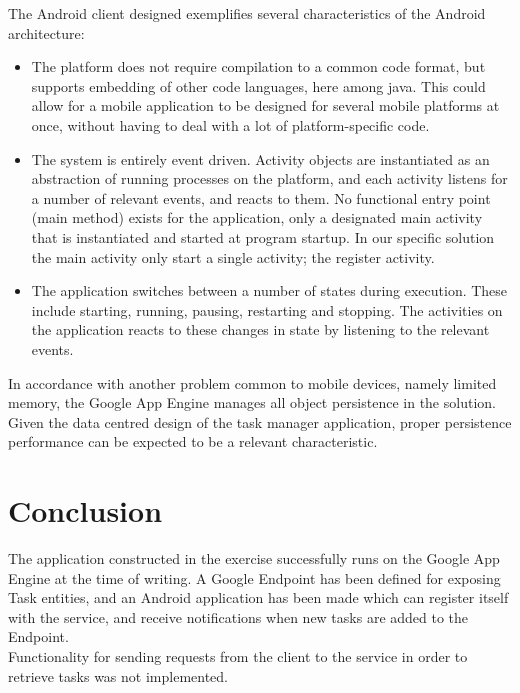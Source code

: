 The Android client designed exemplifies several characteristics of the Android architecture:
\begin{itemize}
	\item The platform does not require compilation to a common code format, but supports embedding of other code languages, here among java. This could allow for a mobile application to be designed for several mobile platforms at once, without having to deal with a lot of platform-specific code.
	\item The system is entirely event driven. Activity objects are instantiated as an abstraction of running processes on the platform, and each activity listens for a number of relevant events, and reacts to them. No functional entry point (main method) exists for the application, only a designated main activity that is instantiated and started at program startup. In our specific solution the main activity only start a single activity; the register activity.
	\item The application switches between a number of states during execution. These include starting, running, pausing, restarting and stopping. The activities on the application reacts to these changes in state by listening to the relevant events.
\end{itemize}

In accordance with another problem common to mobile devices, namely limited memory, the Google App Engine manages all  object persistence in the solution. Given the data centred design of the task manager application, proper persistence performance can be expected to be a relevant characteristic.\\

\section{Conclusion}
The application constructed in the exercise successfully runs on the Google App Engine at the time of writing. A Google Endpoint has been defined for exposing Task entities, and an Android application has been made which can register itself with the service, and receive notifications when new tasks are added to the Endpoint.\\
Functionality for sending requests from the client to the service in order to retrieve tasks was not implemented.